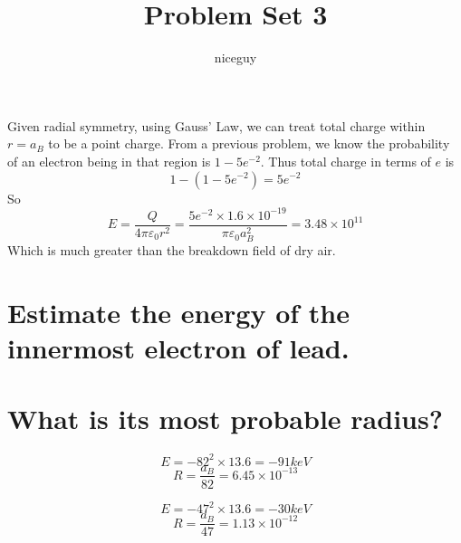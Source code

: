 \documentclass[answers]{exam}
\author{niceguy}
\title{Problem Set 3}
\begin{document}
\maketitle

\begin{questions}


\begin{solution}
	Given radial symmetry, using Gauss' Law, we can treat total charge within $r=a_B$ to be a point charge. From a previous problem, we know the probability of an electron being in that region is $1-5e^{-2}$. Thus total charge in terms of $e$ is
	$$1-(1-5e^{-2}) = 5e^{-2}$$
	So
	$$E = \frac{Q}{4\pi\varepsilon_0r^2} = \frac{5e^{-2}\times1.6\times10^{-19}}{\pi\varepsilon_0a_B^2} = 3.48\times10^{11}$$
	Which is much greater than the breakdown field of dry air.
\end{solution}

\question{}

\begin{parts}
	\part{Estimate the energy of the innermost electron of lead.}
	\part{What is its most probable radius?}
\end{parts}

\begin{solution}
    $$E = -82^2\times13.6 = -91\si{keV}$$
	$$R = \frac{a_B}{82} = 6.45\times10^{-13}$$
\end{solution}


\begin{solution}
	$$E = -47^2\times13.6 = -30\si{keV}$$
	$$R = \frac{a_B}{47} = 1.13\times10^{-12}$$
\end{solution}



\end{questions}
\end{document}
